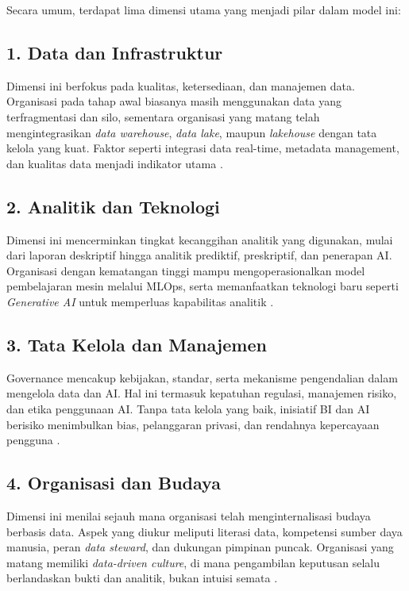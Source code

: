 Secara umum, terdapat lima dimensi utama yang menjadi pilar dalam model ini:

\subsection*{1. Data dan Infrastruktur}
Dimensi ini berfokus pada kualitas, ketersediaan, dan manajemen data. Organisasi pada tahap awal 
biasanya masih menggunakan data yang terfragmentasi dan silo, sementara organisasi yang matang 
telah mengintegrasikan \textit{data warehouse}, \textit{data lake}, maupun \textit{lakehouse} 
dengan tata kelola yang kuat. Faktor seperti integrasi data real-time, metadata management, 
dan kualitas data menjadi indikator utama \cite{kimball2013, armbrust2020delta}.

\subsection*{2. Analitik dan Teknologi}
Dimensi ini mencerminkan tingkat kecanggihan analitik yang digunakan, mulai dari laporan deskriptif 
hingga analitik prediktif, preskriptif, dan penerapan AI. Organisasi dengan kematangan tinggi 
mampu mengoperasionalkan model pembelajaran mesin melalui MLOps, serta memanfaatkan teknologi 
baru seperti \textit{Generative AI} untuk memperluas kapabilitas analitik \cite{davenport2018, chen2021aibi}.

\subsection*{3. Tata Kelola dan Manajemen}
Governance mencakup kebijakan, standar, serta mekanisme pengendalian dalam mengelola data dan AI. 
Hal ini termasuk kepatuhan regulasi, manajemen risiko, dan etika penggunaan AI. Tanpa tata kelola 
yang baik, inisiatif BI dan AI berisiko menimbulkan bias, pelanggaran privasi, dan rendahnya 
kepercayaan pengguna \cite{khatri2010data, zwitter2014}.  

\subsection*{4. Organisasi dan Budaya}
Dimensi ini menilai sejauh mana organisasi telah menginternalisasi budaya berbasis data. 
Aspek yang diukur meliputi literasi data, kompetensi sumber daya manusia, peran \textit{data steward}, 
dan dukungan pimpinan puncak. Organisasi yang matang memiliki \textit{data-driven culture}, di mana 
pengambilan keputusan selalu berlandaskan bukti dan analitik, bukan intuisi semata \cite{davenport2010analytics, lim2023adoption}.

